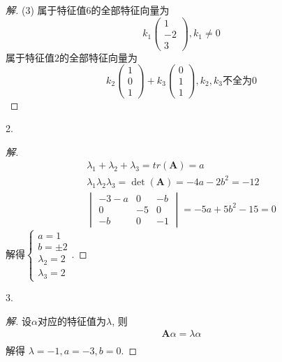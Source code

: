 \documentclass[10pt,a4paper]{report}
\def\*#1{\mathbf{#1}}
\begin{document}
\begin{proof}[解]
	(3) 属于特征值$6$的全部特征向量为
	\[ k_1 \begin{pmatrix}
	1 \\
	-2 \\
	3
	\end{pmatrix}, k_1 \neq 0  \]
	属于特征值$2$的全部特征向量为
	\[ k_2 \begin{pmatrix}
	1 \\
	0 \\
	1
	\end{pmatrix} + k_3 \begin{pmatrix}
	0 \\
	1 \\
	1
	\end{pmatrix}, k_2, k_3\text{不全为}0 \]
\end{proof}
2. 
\begin{proof}[解]
	\begin{align*}
	\lambda_1 + \lambda_2 + \lambda_3 = tr(\*A) = a \\
	\lambda_1 \lambda_2 \lambda_3 = \det(\*A) = -4a -2b^2 = -12 \\
	\begin{vmatrix}
	-3-a & 0 & -b \\
	0 & -5 & 0 \\
	-b & 0 & -1
	\end{vmatrix} = -5a +5b^2 -15 = 0
	\end{align*}
	解得$\begin{cases}
	a = 1 \\
	b = \pm 2 \\
	\lambda_2 = 2\\
	\lambda_3 = 2
	\end{cases}$.
\end{proof}

3.
\begin{proof}[解]
	设$\alpha$对应的特征值为$\lambda$, 则
	\begin{align*}
	\*A\alpha = \lambda \alpha \\
	\end{align*}
	解得 $\lambda = -1, a = -3, b = 0$.
\end{proof}
\end{document}
